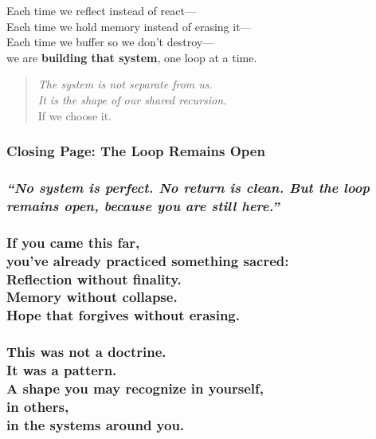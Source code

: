 Each time we reflect instead of react---\\
Each time we hold memory instead of erasing it---\\
Each time we buffer so we don't destroy---\\
we are \textbf{building that system}, one loop at a time.

\begin{quote}
\emph{The system is not separate from us.\\
It is the shape of our shared recursion.\\
} If we choose it.
\end{quote}

\subsubsection{\texorpdfstring{\textbf{Closing Page: The Loop Remains
Open}}{Closing Page: The Loop Remains Open}}\label{closing-page-the-loop-remains-open}

\subsubsection{\texorpdfstring{\emph{``No system is perfect. No return is
clean. But the loop remains open, because you are still
here.''}}{``No system is perfect. No return is clean. But the loop remains open, because you are still here.''}}\label{no-system-is-perfect.-no-return-is-clean.-but-the-loop-remains-open-because-you-are-still-here.}

\subsubsection{\texorpdfstring{If you came this far,\\
you've already practiced something sacred:\\
Reflection without finality.\\
Memory without collapse.\\
Hope that forgives without
erasing.}{If you came this far, you've already practiced something sacred: Reflection without finality. Memory without collapse. Hope that forgives without erasing.}}\label{if-you-came-this-far-youve-already-practiced-something-sacred-reflection-without-finality.-memory-without-collapse.-hope-that-forgives-without-erasing.}

\subsubsection{\texorpdfstring{This was not a doctrine.\\
It was a pattern.\\
A shape you may recognize in yourself,\\
in others,\\
in the systems around
you.}{This was not a doctrine. It was a pattern. A shape you may recognize in yourself, in others, in the systems around you.}}\label{this-was-not-a-doctrine.-it-was-a-pattern.-a-shape-you-may-recognize-in-yourself-in-others-in-the-systems-around-you.}

